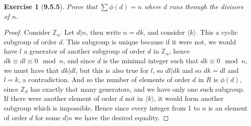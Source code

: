 \documentclass[10pt,oneside,reqno]{amsart}
\theoremstyle{plain}
\newtheorem*{e}{Exercise}
\theoremstyle{definition}
\begin{document}
\begin{enumerate}
\begin{e}[\textbf{9.5.5}]
Prove that $\sum\phi(d) = n$ where $d$ runs through the divisors of $n$. 
\end{e}
\begin{proof}
Consider $\mathbb{Z}_n$. Let $d |n$, then write $n = dk$, and consider $\langle k \rangle$. This a cyclic subgroup of order $d$. This subgroup is unique because if it were not, we would have $l$ a generator of another subgroup of order $d$ in $\mathbb{Z}_n$, hence $dk \equiv dl \equiv 0 \mod n$, and since $d$ is the minimal integer such that $dk \equiv 0 \mod n$, we must have that $dk|dl$, but this is also true for $l$, so $dl|dk$ and so $dk = dl$ and $l = k$, a contradiction. And so the number of elements of order $d$ in $R$ is $\phi(d)$, since $\mathbb{Z}_d$ has exactly that many generators, and we have only one such subgroup. If there were another element of order $d$ not in $\langle k \rangle$, it would form another subgroup which is impossible. Hence since every integer from 1 to $n$ is an element of order $d$ for some $d |n$ we have the desired equality. 
\end{proof}
\end{enumerate}
\end{document}
